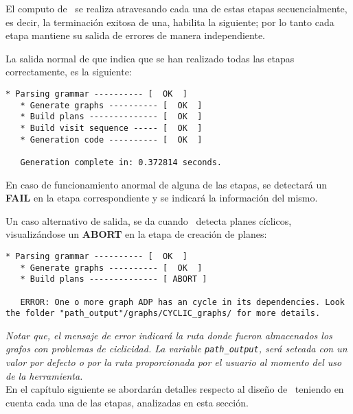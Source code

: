 El computo de \maggen\ se realiza atravesando cada una de estas etapas secuencialmente, es decir, la terminación exitosa de una, habilita la siguiente; por lo tanto cada etapa mantiene su salida de errores de manera independiente. 

La salida normal de \maggen que indica que se han realizado todas las etapas correctamente, es la siguiente:

\begin{lstlisting}[backgroundcolor=\color{white}]
   * Parsing grammar ---------- [  OK  ]
   * Generate graphs ---------- [  OK  ]
   * Build plans -------------- [  OK  ]
   * Build visit sequence ----- [  OK  ]
   * Generation code ---------- [  OK  ]

   Generation complete in: 0.372814 seconds.
\end{lstlisting}

En caso de funcionamiento anormal de alguna de las etapas, se detectará un \textbf{FAIL} en la etapa correspondiente y se indicará la información del mismo.

Un caso alternativo de salida, se da cuando \maggen\ detecta planes cíclicos, visualizándose un \textbf{ABORT} en la etapa de creación de planes:

\begin{lstlisting}[backgroundcolor=\color{white}] 
   * Parsing grammar ---------- [  OK  ]
   * Generate graphs ---------- [  OK  ]
   * Build plans -------------- [ ABORT ]

   ERROR: One o more graph ADP has an cycle in its dependencies. Look the folder "path_output"/graphs/CYCLIC_graphs/ for more details.
\end{lstlisting}

\textit{Notar que, el mensaje de error indicará la ruta donde fueron almacenados los grafos con problemas de ciclicidad. La variable \texttt{path\_output}, será seteada con un valor por defecto o por la ruta proporcionada por el usuario al momento del uso de la herramienta.}\\

En el capítulo siguiente se abordarán detalles respecto al diseño de \maggen\ teniendo en cuenta cada una de las etapas, analizadas en esta sección.
